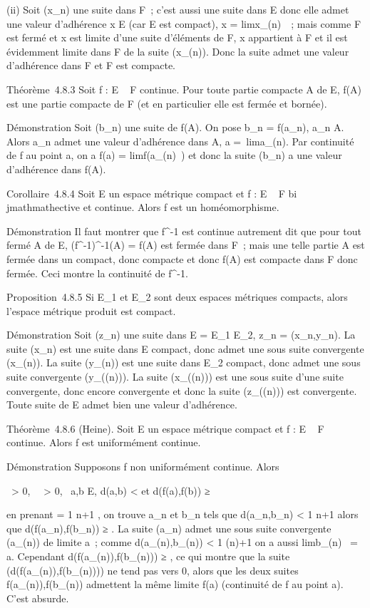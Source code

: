 \documentclass[]{article}
\begin{document}
(ii) Soit (x_n) une suite dans F~; c'est aussi une suite dans E
donc elle admet une valeur d'adhérence x \in E (car E est compact), x
= limx_\phi(n)~~; mais comme F est fermé
et x est limite d'une suite d'éléments de F, x appartient à F et il est
évidemment limite dans F de la suite (x_\phi(n)). Donc la suite
admet une valeur d'adhérence dans F et F est compacte.

Théorème~4.8.3 Soit f : E \rightarrow~ F continue. Pour toute partie compacte A de
E, f(A) est une partie compacte de F (et en particulier elle est fermée
et bornée).

Démonstration Soit (b_n) une suite de f(A). On pose
b_n = f(a_n), a_n \in A. Alors a_n
admet une valeur d'adhérence dans A, a =\
lima_\phi(n). Par continuité de f au point a, on a f(a)
= limf(a_\phi(n)~) et donc la suite
(b_n) a une valeur d'adhérence dans f(A).

Corollaire~4.8.4 Soit E un espace métrique compact et f : E \rightarrow~ F
bi\\jmathmathective et continue. Alors f est un homéomorphisme.

Démonstration Il faut montrer que f^-1 est continue autrement
dit que pour tout fermé A de E, (f^-1)^-1(A) =
f(A) est fermée dans F~; mais une telle partie A est fermée dans un
compact, donc compacte et donc f(A) est compacte dans F donc fermée.
Ceci montre la continuité de f^-1.

Proposition~4.8.5 Si E_1 et E_2 sont deux espaces
métriques compacts, alors l'espace métrique produit est compact.

Démonstration Soit (z_n) une suite dans E = E_1 \times
E_2, z_n = (x_n,y_n). La suite
(x_n) est une suite dans E compact, donc admet une sous suite
convergente (x_\phi(n)). La suite (y_\phi(n)) est une suite
dans E_2 compact, donc admet une sous suite convergente
(y_\phi(\psi(n))). La suite (x_\phi(\psi(n))) est une sous suite
d'une suite convergente, donc encore convergente et donc la suite
(z_\phi(\psi(n))) est convergente. Toute suite de E admet bien une
valeur d'adhérence.

Théorème~4.8.6 (Heine). Soit E un espace métrique compact et f : E \rightarrow~ F
continue. Alors f est uniformément continue.

Démonstration Supposons f non uniformément continue. Alors

\exists~\epsilon \textgreater{} 0,
\forall~~\eta \textgreater{} 0,\quad
\exists~a,b \in E, d(a,b) \textless{}
\eta\text et d(f(a),f(b)) ≥ \epsilon

en prenant \eta = 1 \over n+1 , on trouve a_n
et b_n tels que d(a_n,b_n) \textless{} 1
\over n+1 alors que d(f(a_n),f(b_n))
≥ \epsilon. La suite (a_n) admet une sous suite convergente
(a_\phi(n)) de limite a~; comme d(a_\phi(n),b_\phi(n))
\textless{} 1 \over \phi(n)+1 on a aussi
limb_\phi(n)~ = a. Cependant
d(f(a_\phi(n)),f(b_\phi(n))) ≥ \epsilon, ce qui montre que la suite
(d(f(a_\phi(n)),f(b_\phi(n)))) ne tend pas vers 0, alors que
les deux suites f(a_\phi(n)),f(b_\phi(n)) admettent la même
limite f(a) (continuité de f au point a). C'est absurde.
\end{document}
